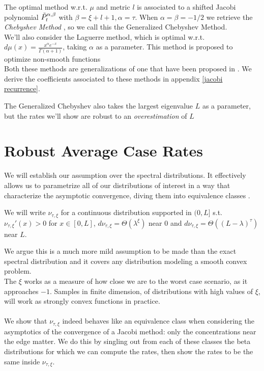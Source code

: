 \documentclass{article}
\begin{document}
The optimal method w.r.t. $\mu$ and metric $l$ is associated to a shifted Jacobi polynomial $\Tilde{P}_t^{\alpha,\beta}$ with $\beta=\xi+l+1, \alpha=\tau$. When $\alpha=\beta=-1/2$ we retrieve the \textit{Chebyshev Method} \cite{hestenes1952methods}, so we call this the Generalized Chebyshev Method. \\
We'll also consider the Laguerre method, which is optimal w.r.t. $d\mu(x)=\frac{x^\alpha e^{-x}}{\Gamma(\alpha+1)}$, taking $\alpha$ as a parameter. This method is proposed to optimize non-smooth functions\\
Both these methods are generalizations of one that have been proposed in \cite{pedregosa2020acceleration}. We derive the coefficients associated to these methods in appendix \ref{jacobi recurrence}.\\
\begin{remark}
The Generalized Chebyshev also takes the largest eigenvalue $L$ as a parameter, but the rates we'll show are robust to an \textit{overestimation} of $L$
\end{remark}

\section{Robust Average Case Rates}
We will establish our assumption over the spectral distributions. It effectively allows us to parametrize all of our distributions of interest in a way that characterize the asymptotic convergence, diving them into equivalence classes .

\begin{assumption}
We will write $\nu_{\tau,\xi}$ for a continuous distribution supported in $(0,L]$ s.t. $\nu_{\tau,\xi}'(x)>0$ for $x\in [0,L]$, $d\nu_{\tau,\xi}=\Theta( \lambda^\xi)$ near $0$ and $d\nu_{\tau,\xi}=\Theta( (L-\lambda)^\tau)$ near $L$. 
\label{assumption}
\end{assumption}

We argue this is a much more mild assumption to be made than the exact spectral distribution and it covers any distribution modeling a smooth convex problem. \\
The $\xi$ works as a measure of how close we are to the worst case scenario, as it approaches $-1$. Samples in finite dimension, of distributions with high values of $\xi$, will work as strongly convex functions in practice.
\paragraph{}
We show that $\nu_{\tau,\xi}$ indeed behaves like an equivalence class when considering the asymptotics of the convergence of a Jacobi method: only the concentrations near the edge matter. We do this by singling out from each of these classes the beta distributions for which we can compute the rates, then show the rates to be the same inside $\nu_{\tau,\xi}$.\\ 
\end{document}
